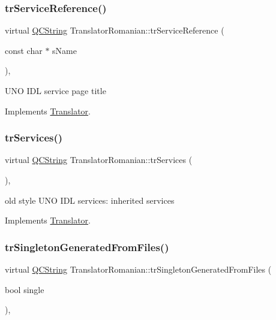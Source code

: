 \subsubsection{\texorpdfstring{trServiceReference()}{trServiceReference()}}
{\footnotesize\ttfamily virtual \mbox{\hyperlink{class_q_c_string}{Q\+C\+String}} Translator\+Romanian\+::tr\+Service\+Reference (\begin{DoxyParamCaption}\item[{const char $\ast$}]{s\+Name }\end{DoxyParamCaption})\hspace{0.3cm}{\ttfamily [inline]}, {\ttfamily [virtual]}}

U\+NO I\+DL service page title 

Implements \mbox{\hyperlink{class_translator}{Translator}}.

\mbox{\label{class_translator_romanian_a5689bab36160e93a8fbfae5824608bac}} 
\subsubsection{\texorpdfstring{trServices()}{trServices()}}
{\footnotesize\ttfamily virtual \mbox{\hyperlink{class_q_c_string}{Q\+C\+String}} Translator\+Romanian\+::tr\+Services (\begin{DoxyParamCaption}{ }\end{DoxyParamCaption})\hspace{0.3cm}{\ttfamily [inline]}, {\ttfamily [virtual]}}

old style U\+NO I\+DL services\+: inherited services 

Implements \mbox{\hyperlink{class_translator}{Translator}}.

\mbox{\label{class_translator_romanian_a6202a1d4f3155487cdb413c07b7be5ee}} 
\subsubsection{\texorpdfstring{trSingletonGeneratedFromFiles()}{trSingletonGeneratedFromFiles()}}
{\footnotesize\ttfamily virtual \mbox{\hyperlink{class_q_c_string}{Q\+C\+String}} Translator\+Romanian\+::tr\+Singleton\+Generated\+From\+Files (\begin{DoxyParamCaption}\item[{bool}]{single }\end{DoxyParamCaption})\hspace{0.3cm}{\ttfamily [inline]}, {\ttfamily [virtual]}}

